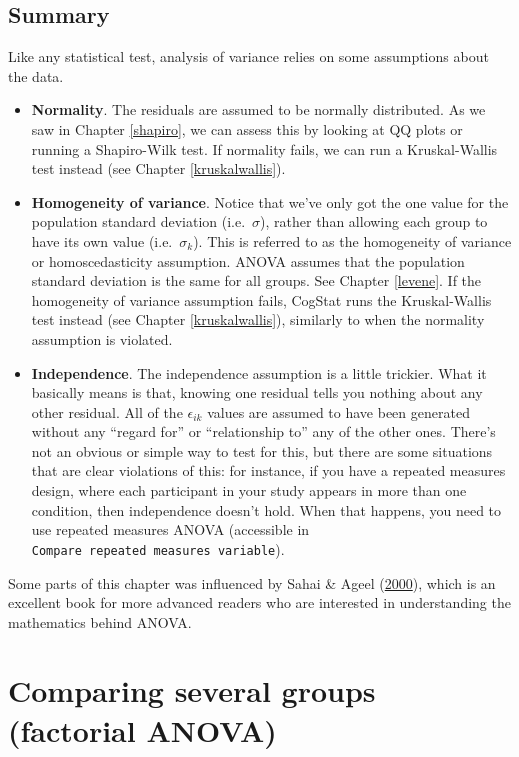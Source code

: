 \documentclass[
]{book}
\providecommand{\tightlist}{%
  \setlength{\itemsep}{0pt}\setlength{\parskip}{0pt}}
\theoremstyle{definition}
\theoremstyle{definition}
\theoremstyle{definition}
\theoremstyle{definition}
\theoremstyle{remark}
\begin{document}
\hypertarget{summary-7}{%
\section{Summary}\label{summary-7}}

Like any statistical test, analysis of variance relies on some assumptions about the data.

\begin{itemize}
\tightlist
\item
  \textbf{Normality}. The residuals are assumed to be normally distributed. As we saw in Chapter \ref{shapiro}, we can assess this by looking at QQ plots or running a Shapiro-Wilk test. If normality fails, we can run a Kruskal-Wallis test instead (see Chapter \ref{kruskalwallis}).
\item
  \textbf{Homogeneity of variance}. Notice that we've only got the one value for the population standard deviation (i.e.~\(\sigma\)), rather than allowing each group to have its own value (i.e.~\(\sigma_k\)). This is referred to as the homogeneity of variance or homoscedasticity assumption. ANOVA assumes that the population standard deviation is the same for all groups. See Chapter \ref{levene}. If the homogeneity of variance assumption fails, CogStat runs the Kruskal-Wallis test instead (see Chapter \ref{kruskalwallis}), similarly to when the normality assumption is violated.
\item
  \textbf{Independence}. The independence assumption is a little trickier. What it basically means is that, knowing one residual tells you nothing about any other residual. All of the \(\epsilon_{ik}\) values are assumed to have been generated without any ``regard for'' or ``relationship to'' any of the other ones. There's not an obvious or simple way to test for this, but there are some situations that are clear violations of this: for instance, if you have a repeated measures design, where each participant in your study appears in more than one condition, then independence doesn't hold. When that happens, you need to use repeated measures ANOVA (accessible in \texttt{Compare\ repeated\ measures\ variable}).
\end{itemize}

Some parts of this chapter was influenced by Sahai \& Ageel (\protect\hyperlink{ref-Sahai2000}{2000}), which is an excellent book for more advanced readers who are interested in understanding the mathematics behind ANOVA.

\hypertarget{anova2}{%
\chapter{Comparing several groups (factorial ANOVA)}\label{anova2}}
\end{document}
